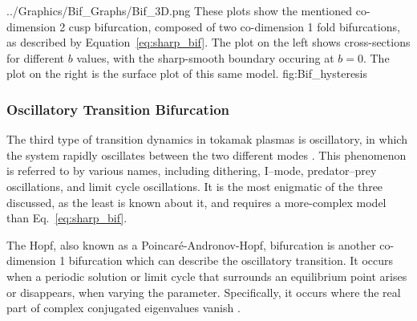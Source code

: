 	{../Graphics/Bif_Graphs/Bif_3D.png}
	{These plots show the mentioned co-dimension 2 cusp bifurcation, composed of two co-dimension 1 fold bifurcations, as described by Equation~\ref{eq:sharp_bif}.
	The plot on the left shows cross-sections for different $b$ values, with the sharp-smooth boundary occuring at $b = 0$.
	The plot on the right is the surface plot of this same model.}
	{fig:Bif_hysteresis}

\subsubsection{Oscillatory Transition Bifurcation}
The third type of transition dynamics in tokamak plasmas is oscillatory, in which the system rapidly oscillates between the two different modes \cite{ryter_survey_2013} \cite{zohm_mhd_1995}.
This phenomenon is referred to by various names, including dithering, I--mode, predator--prey oscillations, and limit cycle oscillations.
It is the most enigmatic of the three discussed, as the least is known about it, and requires a more-complex model than Eq.~\ref{eq:sharp_bif}.

The Hopf, also known as a Poincar\'e-Andronov-Hopf, bifurcation is another co-dimension 1 bifurcation which can describe the oscillatory transition.
It occurs when a periodic solution or limit cycle that surrounds an equilibrium point arises or disappears, when varying the parameter.
Specifically, it occurs where the real part of complex conjugated eigenvalues vanish \cite{munoz-alicea_introduction_2011}.

